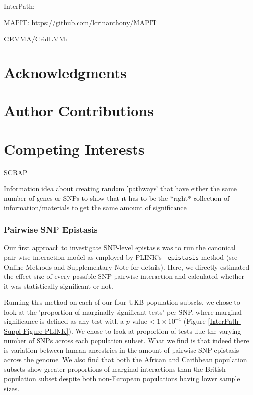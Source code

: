 \documentclass[12pt, a4paper]{article}
\begin{document}
InterPath: \url{}

MAPIT: \url{https://github.com/lorinanthony/MAPIT}

GEMMA/GridLMM: 

\section{Acknowledgments}\label{InterPath-Acknowledgments}

\section{Author Contributions}\label{InterPath-Author-Contributions}

\section{Competing Interests}\label{InterPath-Competing-Interests}

\nolinenumbers

\begingroup


\endgroup









\iffalse

SCRAP

Information idea about creating random 'pathways' that have either the same number of genes or SNPs to show that it has to be the *right* collection of information/materials to get the same amount of significance

\subsubsection{Pairwise SNP Epistasis}

Our first approach to investigate SNP-level epistasis was to run the canonical pair-wise interaction model as employed by PLINK's \texttt{--epistasis} method \citep{Purcell2007} (see Online Methods and Supplementary Note for details). Here, we directly estimated the effect size of every possible SNP pairwise interaction and calculated whether it was statistically significant or not.  

Running this method on each of our four UKB population subsets, we chose to look at the 'proportion of marginally significant tests' per SNP, where marginal significance is defined as any test with a $p$-value < $1\times10^{-4}$ (Figure \ref{InterPath-Suppl-Figure-PLINK}). We chose to look at proportion of tests due the varying number of SNPs across each population subset. What we find is that indeed there is variation between human ancestries in the amount of pairwise SNP epistasis across the genome. We also find that both the African and Caribbean population subsets show greater proportions of marginal interactions than the British population subset despite both non-European populations having lower sample sizes. 
\end{document}
